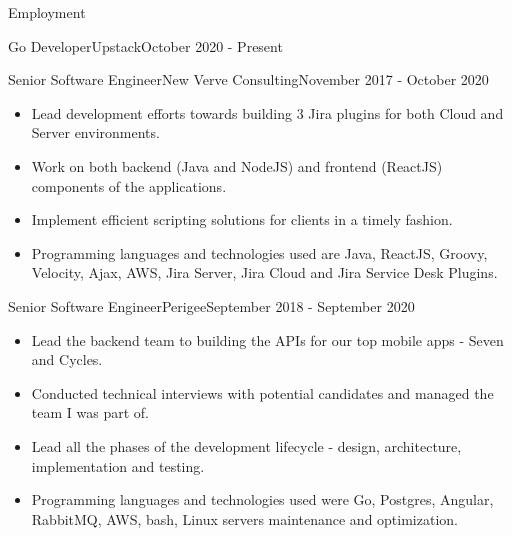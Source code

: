 \documentclass[]{cv}
\begin{document}
	\makeheader
	
	\begin{cvsection}{Employment}
		\begin{cvsubsection}{Go Developer}{Upstack}{October 2020 - Present }
		\end{cvsubsection}

		\begin{cvsubsection}{Senior Software Engineer}{New Verve Consulting}{November 2017 - October 2020}
			\begin{itemize}
				\item Lead development efforts towards building 3 Jira plugins for both Cloud and Server environments.
				\item Work on both backend (Java and NodeJS) and frontend (ReactJS) components of the applications.
				\item Implement efficient scripting solutions for clients in a timely fashion.
				\item Programming languages and technologies used are Java, ReactJS, Groovy, Velocity, Ajax, AWS, 
				Jira Server, Jira Cloud and Jira Service Desk Plugins.
			\end{itemize}
		\end{cvsubsection}

		\begin{cvsubsection}{Senior Software Engineer}{Perigee}{September 2018 - September 2020}
			\begin{itemize}
				\item Lead the backend team to building the APIs for our top mobile apps - Seven and Cycles.
				\item Conducted technical interviews with potential candidates and managed the team I was part of.
				\item Lead all the phases of the development lifecycle - design, architecture, implementation and testing.
				\item Programming languages and technologies used were Go, Postgres, Angular, RabbitMQ, AWS, bash, Linux servers maintenance and optimization.
			\end{itemize}
		\end{cvsubsection}
		

\end{cvsection}
\end{document}
